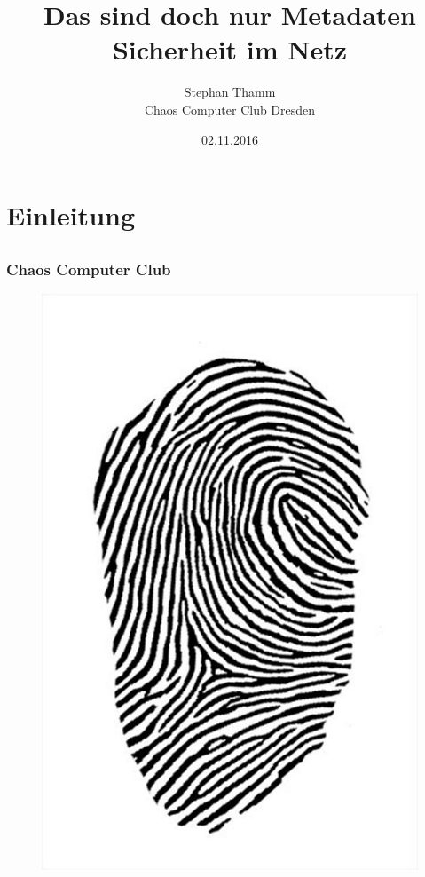 \documentclass[12pt]{beamer}
\title{Das sind doch nur Metadaten \\ Sicherheit im Netz}
\author{\small Stephan Thamm\\\large Chaos Computer Club Dresden}
\date{02.11.2016}
\begin{document}
\maketitle

\section{Einleitung}
\subsection{}

\begin{frame}
  \frametitle{Chaos Computer Club}
  \begin{figure}
    \includegraphics[height=0.7\textheight]{img/fingerabdruck.jpg}
  \end{figure}
\end{frame}
\end{document}
